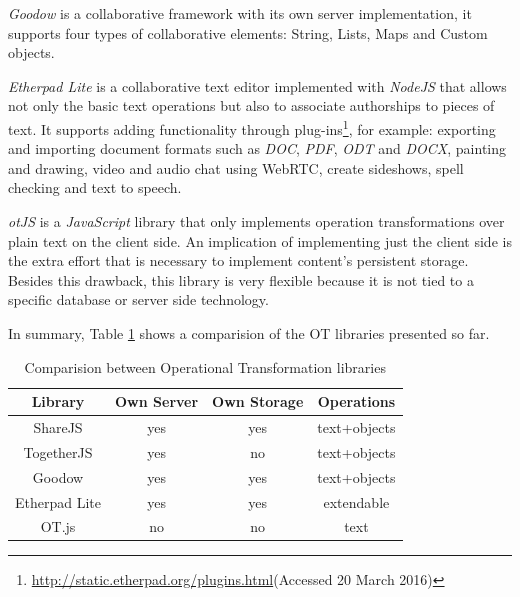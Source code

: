	\emph{Goodow} is a collaborative framework with its own server implementation, it supports four types of collaborative elements: String, Lists, Maps and Custom objects.
	

	\emph{Etherpad Lite} is a collaborative text editor implemented with \emph{NodeJS} that allows not only the basic text operations but also to associate authorships to pieces of text. It supports adding functionality through plug-ins\footnote{\url{http://static.etherpad.org/plugins.html}(Accessed 20 March 2016)}, for example: exporting and importing document formats such as \emph{DOC}, \emph{PDF}, \emph{ODT} and \emph{DOCX}, painting and drawing, video and audio chat using WebRTC, create sideshows, spell checking and text to speech.
	


	\emph{otJS} is a \emph{JavaScript} library that only implements operation transformations over plain text on the client side. An implication of implementing just the client side is the extra effort that is necessary to implement content's persistent storage. Besides this drawback, this library is very flexible because it is not tied to a specific database or server side technology.
	

	In summary, Table \ref{table:otcomparision} shows a comparision of the \ac{OT} libraries presented so far.

\begin{table}[!htb]
\centering
\caption{Comparision between Operational Transformation libraries}
\label{table:otcomparision}
\begin{tabular}{|c|c|c|c|}
\hline
\textbf{Library} & \textbf{Own Server} & \textbf{Own Storage} & \textbf{Operations} \\ \hline
ShareJS          & yes                 & yes                  & text+objects        \\ \hline
TogetherJS       & yes                 & no                   & text+objects        \\ \hline
Goodow           & yes                 & yes                  & text+objects        \\ \hline
Etherpad Lite    & yes                 & yes                  & extendable 			    \\ \hline
OT.js            & no                  & no                   & text                \\ \hline
\end{tabular}
\end{table}



